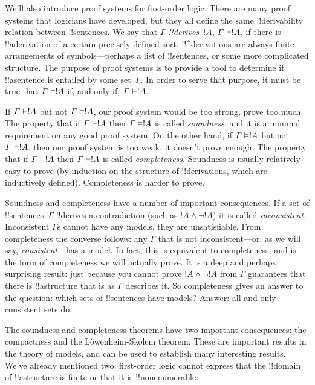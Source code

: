 \documentclass[../../../include/open-logic-section]{subfiles}
\begin{document}


We'll also introduce proof systems for first-order logic.  There are
many proof systems that logicians have developed, but they all define
the same !!{derivability} relation between !!{sentence}s. We say that
$\Gamma$ \emph{!!{derive}s}~$!A$, $\Gamma \Proves !A$, if there is
!!a{derivation} of a certain precisely defined sort. !!^{derivation}s
are always finite arrangements of symbols---perhaps a list of
!!{sentence}s, or some more complicated structure.  The purpose of
proof systems is to provide a tool to determine if !!a{sentence} is
entailed by some set~$\Gamma$.  In order to serve that purpose, it
must be true that $\Gamma \Entails !A$ if, and only if, $\Gamma
\Proves !A$.

If $\Gamma \Proves !A$ but not $\Gamma \Entails !A$, our proof system
would be too strong, prove too much.  The property that if $\Gamma
\Proves !A$ then $\Gamma \Entails !A$ is called \emph{soundness}, and
it is a minimal requirement on any good proof system. On the other
hand, if $\Gamma \Entails !A$ but not $\Gamma \Proves !A$, then our
proof system is too weak, it doesn't prove enough.  The property that
if $\Gamma \Entails !A$ then $\Gamma \Proves !A$ is called
\emph{completeness}. Soundness is usually relatively easy to prove (by
induction on the structure of !!{derivation}s, which are inductively
defined). Completeness is harder to prove.

Soundness and completeness have a number of important consequences. If
a set of !!{sentence}s~$\Gamma$ !!{derive}s a contradiction (such as
$!A \land \lnot !A$) it is called \emph{inconsistent}. Inconsistent
$\Gamma$s cannot have any models, they are unsatisfiable. From
completeness the converse follows: any $\Gamma$ that is not
inconsistent---or, as we will say, \emph{consistent}---has a model. In
fact, this is equivalent to completeness, and is the form of
completeness we will actually prove.  It is a deep and perhaps
surprising result: just because you cannot prove $!A \land \lnot !A$
from $\Gamma$ guarantees that there is !!a{structure} that is as
$\Gamma$ describes it.  So completeness gives an answer to the
question: which sets of !!{sentence}s have models? Answer: all and only
consistent sets do.

The soundness and completeness theorems have two important
consequences: the compactness and the L\"owenheim-Skolem theorem.
These are important results in the theory of models, and can be used
to establish many interesting results. We've already mentioned two:
first-order logic cannot express that the !!{domain} of !!a{structure}
is finite or that it is !!{nonenumerable}.
\end{document}
